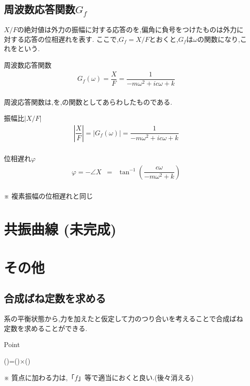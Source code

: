 \documentclass[a4paper]{jsarticle}
\begin{document}
\subsection{周波数応答関数$G_f$}
$X/F$の絶対値は外力の振幅に対する応答のを,偏角に負号をつけたものは外力に対する応答の位相遅れを表す.
ここで,$G_f=X/F$とおくと,$G_f$は$\omega$の関数になり,これをという.
\begin{itembox}[l]{周波数応答関数}
    \begin{eqnarray*}
        G_f\left(\omega\right)=\dfrac{X}{F}=\dfrac{1}{-m\omega^2+ic\omega +k}\\
    \end{eqnarray*}
\end{itembox}
周波応答関数は,を,の関数としてあらわしたものである.
\begin{itembox}[l]{振幅比$|X/F|$}
    \begin{eqnarray*}
        \left|\dfrac{X}{F}\right|=|G_f\left(\omega\right)|=\dfrac{1}{-m\omega^2+ic\omega+k}\\
    \end{eqnarray*}
\end{itembox}
\begin{itembox}[l]{位相遅れ$\varphi$}
    \begin{eqnarray*}
        \varphi=-\angle X &=&\tan^{-1}\left(\dfrac{c\omega}{-m\omega^2+k}\right)\\
    \end{eqnarray*}
    \begin{center}
        ※ 複素振幅の位相遅れと同じ
    \end{center}
\end{itembox}
\section{共振曲線 (未完成)}

\section{その他}
\subsection{合成ばね定数を求める}
系の平衡状態から,力を加えたと仮定して力のつり合いを考えることで合成ばね定数を求めることができる.
\begin{itembox}[l]{Point}
    \begin{center}
        ()\quad=\quad()\quad×\quad()
    \end{center}
\end{itembox}
※ 質点に加わる力は,「$f$」等で適当におくと良い.(後々消える)
\end{document}
